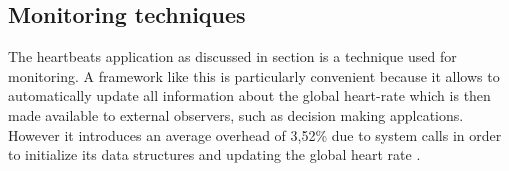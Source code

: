 \subsection{Monitoring techniques}
\label{sec:selfawareness}
The heartbeats application as discussed in section \cite{sec:selfaware} is a technique used for monitoring. A framework like this is particularly convenient because it allows to automatically update all information about the global heart-rate which is then made available to external observers, such as decision making applcations. However it introduces an average overhead of 3,52\% due to system calls in order to initialize its data structures and updating the global heart rate \cite{selfaware}.